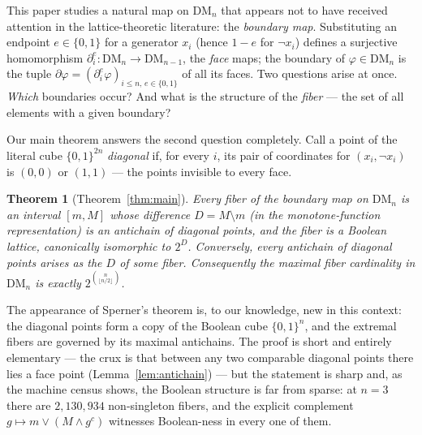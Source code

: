 \documentclass[11pt]{amsart}
\newtheorem*{thmstar}{Theorem}
\theoremstyle{definition}
\newcommand{\DM}{\mathrm{DM}}
\newcommand{\bnd}{\partial}
\begin{document}
This paper studies a natural map on $\DM_n$ that appears not to have
received attention in the lattice-theoretic literature: the
\emph{boundary map}.  Substituting an endpoint $e \in \{0,1\}$ for a
generator $x_i$ (hence $1-e$ for $\neg x_i$) defines a surjective
homomorphism $\bnd_i^e : \DM_n \to \DM_{n-1}$, the \emph{face} maps;
the boundary of $\varphi \in \DM_n$ is the tuple
$\bnd\varphi = (\bnd_i^e \varphi)_{i \le n,\, e \in \{0,1\}}$ of all
its faces.  Two questions arise at once.  \emph{Which} boundaries
occur?  And what is the structure of the \emph{fiber} --- the set of
all elements with a given boundary?

Our main theorem answers the second question completely.  Call a
point of the literal cube $\{0,1\}^{2n}$ \emph{diagonal} if, for
every $i$, its pair of coordinates for $(x_i, \neg x_i)$ is $(0,0)$
or $(1,1)$ --- the points invisible to every face.

\begin{thmstar}[Theorem~\ref{thm:main}]
  Every fiber of the boundary map on $\DM_n$ is an interval $[m, M]$
  whose difference $D = M \setminus m$ (in the monotone-function
  representation) is an antichain of diagonal points, and the fiber
  is a Boolean lattice, canonically isomorphic to $2^{D}$.
  Conversely, every antichain of diagonal points arises as the $D$ of
  some fiber.  Consequently the maximal fiber cardinality in $\DM_n$
  is exactly $2^{\binom{n}{\lfloor n/2 \rfloor}}$.
\end{thmstar}

The appearance of Sperner's theorem \cite{Sperner} is, to our
knowledge, new in this context: the diagonal points form a copy of
the Boolean cube $\{0,1\}^n$, and the extremal fibers are governed by
its maximal antichains.  The proof is short and entirely elementary
--- the crux is that between any two comparable diagonal points there
lies a face point (Lemma~\ref{lem:antichain}) --- but the statement
is sharp and, as the machine census shows, the Boolean structure is
far from sparse: at $n = 3$ there are $2{,}130{,}934$ non-singleton
fibers, and the explicit complement $g \mapsto m \vee (M \wedge
g^{c})$ witnesses Boolean-ness in every one of them.
\end{document}
